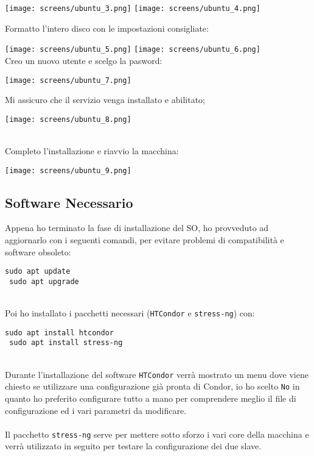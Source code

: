 	\texttt{[image: screens/ubuntu\_3.png]}
	\texttt{[image: screens/ubuntu\_4.png]}
	
\pagebreak
Formatto l'intero disco con le impostazioni consigliate:

	\texttt{[image: screens/ubuntu\_5.png]}
	\texttt{[image: screens/ubuntu\_6.png]}
\ \\
Creo un nuovo utente e scelgo la pasword:
\begin{center}
	\texttt{[image: screens/ubuntu\_7.png]}
\end{center}
\pagebreak
Mi assicuro che il servizio  venga installato e abilitato;
\begin{center}
	\texttt{[image: screens/ubuntu\_8.png]}
\end{center}
\ \\
Completo l'installazione e riavvio la macchina:

\begin{center}
	\texttt{[image: screens/ubuntu\_9.png]}
\end{center}
\pagebreak
\subsection{Software Necessario}

Appena ho terminato la fase di installazione del SO, ho provveduto ad aggiornarlo con i
seguenti comandi, per evitare problemi di compatibilit\`{a} e software obsoleto:

\begin{lstlisting}[style=cmd]
 sudo apt update
 sudo apt upgrade
\end{lstlisting}
\ \\
Poi ho installato i pacchetti necessari (\lstinline[style=cmd]|HTCondor| e \lstinline[style=cmd]|stress-ng|) con:

\begin{lstlisting}[style=cmd]
 sudo apt install htcondor 
 sudo apt install stress-ng
\end{lstlisting}
\ \\
Durante l'installazione del software \lstinline[style=cmd]|HTCondor| verr\`{a} mostrato un menu dove viene chiesto se utilizzare una configurazione gi\`{a} pronta di Condor, io ho scelto \lstinline[style=cmd]|No| in quanto ho preferito configurare tutto a mano per comprendere meglio il file di configurazione ed i vari parametri da modificare.\\
\ \\
Il pacchetto \lstinline[style=cmd]|stress-ng| serve per mettere sotto sforzo i vari core della macchina e verr\`{a} utilizzato in seguito per testare la configurazione dei due slave.

